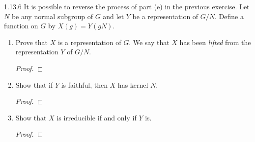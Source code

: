 \documentclass{../../math174}
\date{Wednesday, February 27}
\author{}
\begin{document}
\begin{problemlist}
\item[1.13.6] It is possible to reverse the process of part (e) in the
  previous exercise.  Let \(N\) be any normal subgroup of \(G\) and
  let \(Y\) be a representation of \(G/N\).  Define a function on
  \(G\) by \(X(g) = Y(gN)\).
  \begin{enumerate}
  \item Prove that \(X\) is a representation of \(G\).  We say that
    \(X\) has been \textit{lifted} from the representation \(Y\) of
    \(G/N\).

    \begin{solution}
      \begin{proof}

      \end{proof}
    \end{solution}

  \item Show that if \(Y\) is faithful, then \(X\) has kernel \(N\).

    \begin{solution}
      \begin{proof}

      \end{proof}
    \end{solution}

  \item Show that \(X\) is irreducible if and only if \(Y\) is.

    \begin{solution}
      \begin{proof}

      \end{proof}
    \end{solution}
  \end{enumerate}
\end{problemlist}
\end{document}
